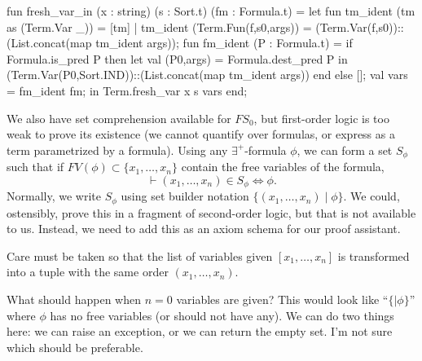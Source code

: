 \nwenddocs{}\endmoddef\nwstartdeflinemarkup{}\nwenddeflinemarkup
fun fresh_var_in (x : string) (s : Sort.t) (fm : Formula.t) =
  let
    fun tm_ident (tm as (Term.Var _)) = [tm]
      | tm_ident (Term.Fun(f,s0,args)) =
          (Term.Var(f,s0))::(List.concat(map tm_ident args));
    fun fm_ident (P : Formula.t) =
      if Formula.is_pred P
      then let val (P0,args) = Formula.dest_pred P
           in (Term.Var(P0,Sort.IND))::(List.concat(map tm_ident args)) end
      else [];
    val vars = fm_ident fm;
  in
    Term.fresh_var x s vars
  end;
\nwendcode{}\nwdocspar

\begin{node}
We also have set comprehension available for $FS_{0}$, but first-order
logic is too weak to prove its existence (we cannot quantify over
formulas, or express as a term parametrized by a formula). Using
any $\exists^{+}$-formula $\phi$, we can form a set $S_{\phi}$ such
that if $FV(\phi)\subset\{x_{1},\dots,x_{n}\}$ contain the free
variables of the formula,
\begin{equation}
\vdash(x_{1},\dots,x_{n})\in S_{\phi}\iff\phi.
\end{equation}
Normally, we write $S_{\phi}$ using set builder notation $\{(x_{1},\dots,x_{n})\mid\phi\}$.
We could, ostensibly, prove this in a fragment of second-order logic,
but that is not available to us. Instead, we need to add this as an
axiom schema for our proof assistant.

Care must be taken so that the list of variables given $[x_{1},\dots,x_{n}]$
is transformed into a tuple with the same order $(x_{1},\dots,x_{n})$.

What should happen when $n=0$ variables are given? This would look
like ``$\{\mid\phi\}$'' where $\phi$ has no free variables (or should not
have any). We can do two things here: we can raise an exception, or we
can return the empty set. I'm not sure which should be preferable.
\end{node}

